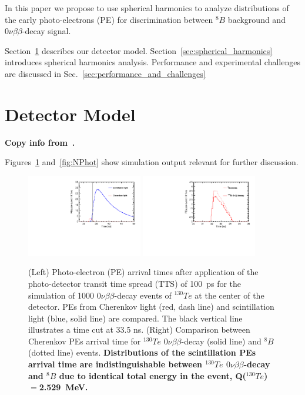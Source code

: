 \documentclass[12pt,twoside,letterpaper]{article}
\newcommand{\vbb}{0\nu\beta\beta}
\newcommand{\Te}{^{130}Te}
\newcommand{\B}{^{8}B}
\begin{document}
In this paper we propose to use spherical harmonics to analyze distributions of the early photo-electrons (PE) for discrimination between $\B$ background and $\vbb$-decay signal.

Section~\ref{sec:detector_description} describes our detector model. Section~\ref{sec:spherical_harmonics} introduces spherical harmonics analysis. Performance and experimental challenges are discussed in Sec.~\ref{sec:performance_and_challenges}


\section{Detector Model}
\label{sec:detector_description}
{\bf Copy info from~\cite{Directionality}.

Figures~\ref{fig:Arrival_time} and~\ref{fig:NPhot} show simulation output relevant for further discussion.}

\begin{figure}[htb]
\centering
\includegraphics[angle=0,width=0.45\textwidth]{plots/hT_Te130.pdf}
\includegraphics[angle=0,width=0.45\textwidth]{plots/hTche_Te130_B8.pdf}
\caption{(Left) Photo-electron (PE) arrival times after application of the photo-detector transit time spread (TTS) of 100~ps for the simulation of 1000 $\vbb$-decay events of $\Te$ at the center of the detector. PEs from Cherenkov light (red, dash line) and scintillation light (blue, solid
line) are compared. The black vertical line illustrates a time cut at 33.5 ns. (Right) Comparison between Cherenkov PEs arrival time for $\Te$ $\vbb$-decay (solid line) and $\B$ (dotted line) events. {\bf Distributions of the scintillation PEs arrival time are indistinguishable between $\Te$ $\vbb$-decay and $\B$ due to identical total energy in the event, Q($\Te$)$=$2.529~MeV.} }
\label{fig:Arrival_time}
\end{figure}
\end{document}
